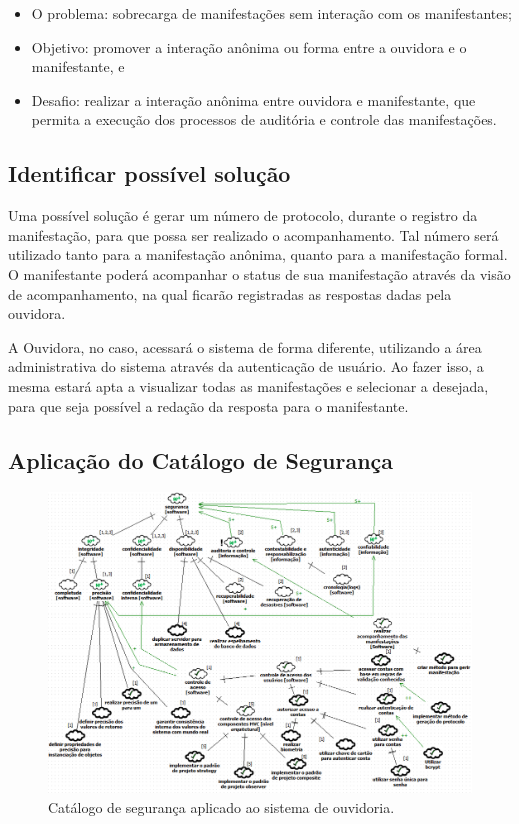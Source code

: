\begin{itemize}
	\item O problema: sobrecarga de manifestações sem interação com os manifestantes; 
	\item Objetivo: promover a interação anônima ou forma entre a ouvidora e o manifestante, e
	\item Desafio: realizar a interação anônima entre ouvidora e manifestante, que permita a execução dos processos de auditória e controle das manifestações.
\end{itemize}

\subsection{Identificar possível solução}

Uma possível solução é gerar um número de protocolo, durante o registro da manifestação, para que possa ser realizado o acompanhamento. Tal número será utilizado tanto para a manifestação anônima, quanto para a manifestação formal. O manifestante poderá acompanhar o status de sua manifestação através da visão de acompanhamento, na qual ficarão registradas as respostas dadas pela ouvidora.

A Ouvidora, no caso, acessará o sistema de forma diferente, utilizando a área administrativa do sistema através da autenticação de usuário. Ao fazer isso, a mesma estará apta a visualizar todas as manifestações e selecionar a desejada, para que seja possível a redação da resposta para o manifestante.  

\subsection{Aplicação do Catálogo de Segurança}

\begin{figure}[h!]
	\centering
	\includegraphics[keepaspectratio=true,scale=0.6]{figuras/catalogoPersona2.PNG}
	\caption{Catálogo de segurança aplicado ao sistema de ouvidoria.}
	\label{catalogoPersona2}
\end{figure}



